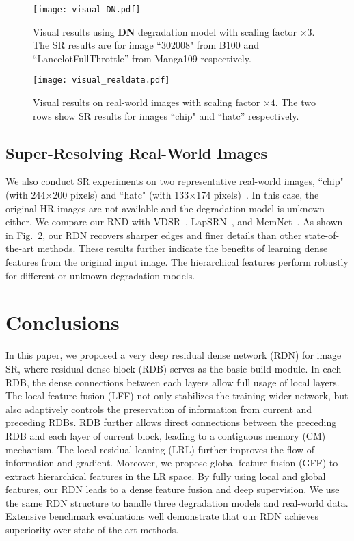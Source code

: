 \documentclass[10pt,twocolumn,letterpaper]{article}
\begin{document}
\begin{figure}[htbp]
\centering
\texttt{[image: visual\_DN.pdf]}
\caption{Visual results using \textbf{DN} degradation model with scaling factor $\times3$. The SR results are for image ``302008" from B100 and ``LancelotFullThrottle'' from Manga109 respectively.}
\label{fig:visual_DN}  
\vspace{-5mm}
\end{figure}

\begin{figure}[htbp]
\centering
\texttt{[image: visual\_realdata.pdf]}
\caption{Visual results on real-world images with scaling factor $\times4$. The two rows show SR results for images ``chip" and ``hatc'' respectively.}
\label{fig:visual_realdata} 
\vspace{-5mm} 
\end{figure}
\vspace{-1mm}
\subsection{Super-Resolving Real-World Images}
\label{subsec:realworld}
\vspace{-1mm}
We also conduct SR experiments on two representative real-world images, ``chip" (with 244$\times$200 pixels) and ``hatc" (with 133$\times$174 pixels)~\cite{zhang2017collaborative}. In this case, the original HR images are not available and the degradation model is unknown either. We compare our RND with VDSR~\cite{kim2016accurate}, LapSRN~\cite{lai2017deep}, and MemNet~\cite{tai2017memnet}. As shown in Fig.~\ref{fig:visual_realdata}, our RDN recovers sharper edges and finer details than other state-of-the-art methods. These results further indicate the benefits of learning dense features from the original input image. The hierarchical features perform robustly for different or unknown degradation models.
\vspace{-3mm}
\section{Conclusions}
\vspace{-2mm}
In this paper, we proposed a very deep residual dense network (RDN) for image SR, where residual dense block (RDB) serves as the basic build module. In each RDB, the dense connections between each layers allow full usage of local layers. The local feature fusion (LFF) not only stabilizes the training wider network, but also adaptively controls the preservation of information from current and preceding RDBs. RDB further allows direct connections between the preceding RDB and each layer of current block, leading to a contiguous memory (CM) mechanism. The local residual leaning (LRL) further improves the flow of information and gradient. Moreover, we propose global feature fusion (GFF) to extract hierarchical features in the LR space. By fully using local and global features, our RDN leads to a dense feature fusion and deep supervision. We use the same RDN structure to handle three degradation models and real-world data. Extensive benchmark evaluations well demonstrate that our RDN achieves superiority over state-of-the-art methods. 
\vspace{-2mm}
\end{document}
